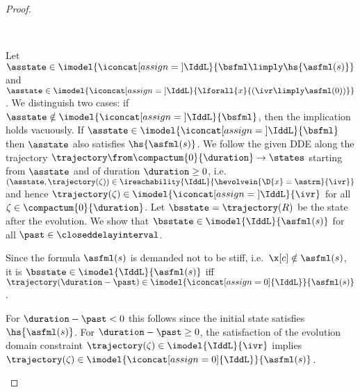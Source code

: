 \begin{proof}
\begin{labeling}{~~~~~~~}
        \item[\irref{DDW}] Let $\asstate\in\imodel{\iconcat[assign={}]{\IddL}}{\bsfml\limply\hs{\asfml(s)}}$ and $\asstate\in\imodel{\iconcat[assign={}]{\IddL}}{\lforall{x}{(\ivr\limply\asfml(0))}}$.
        We distinguish two cases:
        if $\asstate\notin\imodel{\iconcat[assign={}]{\IddL}}{\bsfml}$, then the implication holds vacuously.
        If $\asstate\in\imodel{\iconcat[assign={}]{\IddL}}{\bsfml}$ then $\asstate$ also satisfies $\hs{\asfml(s)}$.
        We follow the given DDE along the trajectory $\trajectory\from\compactum{0}{\duration}\to\states$ starting from $\asstate$ and of duration $\duration\geq 0$, i.e.\ $(\asstate,\trajectory(\zeta))\in\ireachability{\IddL}{\hevolvein{\D{x}=\astrm}{\ivr}}$ and hence $\trajectory(\zeta)\in\imodel{\iconcat[assign={}]{\IddL}}{\ivr}$ for all $\zeta\in\compactum{0}{\duration}$. Let $\bsstate=\trajectory(R)$ be the state after the evolution. We show that $\bsstate\in\imodel{\IddL}{\asfml(s)}$ for all $\past\in\closeddelayinterval$.

        Since the formula $\asfml(s)$ is demanded not to be stiff, i.e.\ $\x[c]\notin\asfml(s)$, it is $\bsstate\in\imodel{\IddL}{\asfml(s)}$ iff $\trajectory(\duration-\past)\in\imodel{\iconcat[assign=0]{\IddL}}{\asfml(s)}$.

        For $\duration-\past<0$ this follows since the initial state satisfies $\hs{\asfml(s)}$.
        For $\duration-\past\geq 0$, the satisfaction of the evolution domain constraint $\trajectory(\zeta)\in\imodel{\IddL}{\ivr}$ implies $\trajectory(\zeta)\in\imodel{\iconcat[assign=0]{\IddL}}{\asfml(s)}$.
    \end{labeling}
    \end{proof}




    



